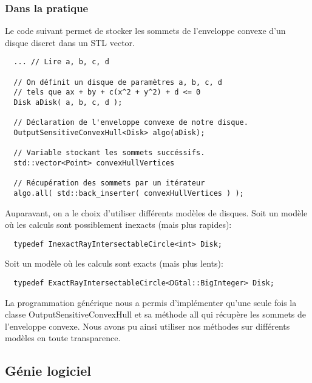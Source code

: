
\subsubsection{Dans la pratique}

Le code suivant permet de stocker les sommets de l'enveloppe convexe
d'un disque discret dans un STL vector. 

\begin{verbatim}
  ... // Lire a, b, c, d

  // On définit un disque de paramètres a, b, c, d
  // tels que ax + by + c(x^2 + y^2) + d <= 0
  Disk aDisk( a, b, c, d );	 
  
  // Déclaration de l'enveloppe convexe de notre disque.
  OutputSensitiveConvexHull<Disk> algo(aDisk);
  
  // Variable stockant les sommets succéssifs.
  std::vector<Point> convexHullVertices
  
  // Récupération des sommets par un itérateur 
  algo.all( std::back_inserter( convexHullVertices ) );  
\end{verbatim}

Auparavant, on a le choix d'utiliser différents modèles de disques. 
Soit un modèle où les calculs sont possiblement inexacts (mais plus rapides): 
\begin{verbatim}
  typedef InexactRayIntersectableCircle<int> Disk;
\end{verbatim}
Soit un modèle où les calculs sont exacts (mais plus lents):
\begin{verbatim}
  typedef ExactRayIntersectableCircle<DGtal::BigInteger> Disk;
\end{verbatim}

La programmation générique nous a permis d'implémenter qu'une seule fois la classe OutputSensitiveConvexHull et sa méthode all qui récupère les sommets de l'enveloppe convexe. Nous avons pu ainsi utiliser nos méthodes sur différents modèles en toute transparence. 

\subsection{Génie logiciel}

